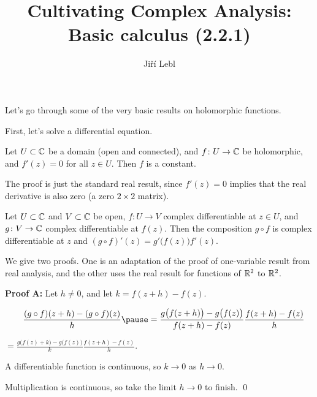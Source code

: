 \documentclass[10pt,aspectratio=169]{beamer}
\author{Ji\v{r}\'i Lebl}
\institute[OSU]{%
Departemento pri Matematiko de Oklahoma {\^S}tata Universitato}
\title{Cultivating Complex Analysis:\\%
Basic calculus (2.2.1)}
\date{}
\begin{document}
\begin{frame}
\titlepage
\end{frame}

\begin{frame}
Let's go through some of the very basic results on holomorphic functions.

\medskip
\pause

First, let's solve a differential equation.

\pause

\begin{proposition}
Let $U \subset {\mathbb{C}}$ be a domain (open and connected),
and $f \colon U \to {\mathbb{C}}$ be holomorphic, and $f'(z) = 0$ for all $z \in U$.
Then $f$ is a constant.
\end{proposition}

\pause

The proof is just the standard real result, since $f'(z)=0$ implies that
the real derivative is also zero (a zero $2 \times 2$ matrix).
\end{frame}

\begin{frame}
\begin{proposition}
Let $U \subset {\mathbb{C}}$ and $V \subset {\mathbb{C}}$ be open, $f \colon U \to V$
complex differentiable at $z \in U$, and $g \colon V \to {\mathbb{C}}$ complex differentiable
at $f(z)$.  Then the composition $g \circ f$
is complex differentiable at $z$ and $(g \circ f)'(z) = g'\bigl(f(z)\bigr) f'(z)$.
\end{proposition}

\pause

We give two proofs.  One is an adaptation of the proof of one-variable result
from real analysis, and the other uses the real result for functions of ${\mathbb{R}}^2$
to ${\mathbb{R}}^2$.

\medskip
\pause

\textbf{Proof A:}
Let $h \not= 0$, and let $k = f(z+h) -f(z)$.

\medskip
\pause

$\displaystyle
\qquad
\frac{(g \circ f)(z+h) - (g \circ f)(z)}{h}
\pause
 =
\frac{g \bigl( f(z+h) \bigr) - g\bigl( f(z) \bigr)}{f(z+h)-f(z)}
\frac{f(z+h)-f(z)}{h}
$

\pause
\medskip

%
$\displaystyle
=
\frac{g \bigl( f(z) + k \bigr) - g\bigl( f(z) \bigr)}{k}
\frac{f(z+h)-f(z)}{h} .
$

\medskip
\pause

A differentiable function is continuous, so $k \to 0$ as $h \to 0$.
\pause
\medskip

Multiplication is continuous, so take the limit $h \to 0$ to finish.
\qed

\end{frame}
\end{document}
